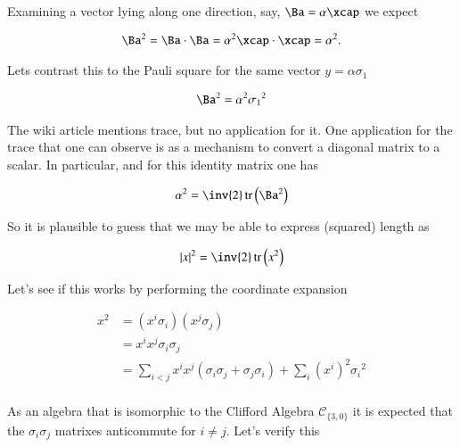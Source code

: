 \documentclass{article}
\newcommand{\Clifford}[2]{\mathcal{C}_{\{{#1},{#2}\}}}
\DeclareMathOperator{\tr}{tr}
\newcommand{\traceB}[1]{\tr\left({#1}\right)}
\begin{document}
Examining a vector lying along one direction, say, $\Ba = \alpha\xcap$ we expect

\begin{align*}
\Ba^2 = \Ba \cdot \Ba = \alpha^2 \xcap \cdot \xcap = \alpha^2.
\end{align*}

Lets contrast this to the Pauli square for the same vector $y = \alpha\sigma_1$

\begin{align*}
\Ba^2 = \alpha^2 {\sigma_1}^2
\end{align*}

The wiki article mentions trace, but no application for it.  One application for the trace that one can observe is as a mechanism to convert a diagonal
matrix to a scalar.
In particular, and for this identity matrix one has

\begin{align*}
\alpha^2 = \inv{2} \traceB{\Ba^2}
\end{align*}

So it is plausible to guess that we may be able to express (squared) length as

\begin{align*}
\Abs{x}^2 = \inv{2}\traceB{x^2}
\end{align*}

Let's see if this works by performing the coordinate expansion

\begin{align*}
x^2
&= (x^i \sigma_i)(x^j \sigma_j) \\
&= x^i x^j \sigma_i \sigma_j \\
&= \sum_{i < j} x^i x^j (\sigma_i \sigma_j + \sigma_j \sigma_i) + \sum_i (x^i)^2 {\sigma_i}^2 \\
\end{align*}

As an algebra that is isomorphic to the Clifford Algebra $\Clifford{3}{0}$ it is expected that the $\sigma_i \sigma_j$ matrixes anticommute for $i \ne j$.  Let's verify this
\end{document}

